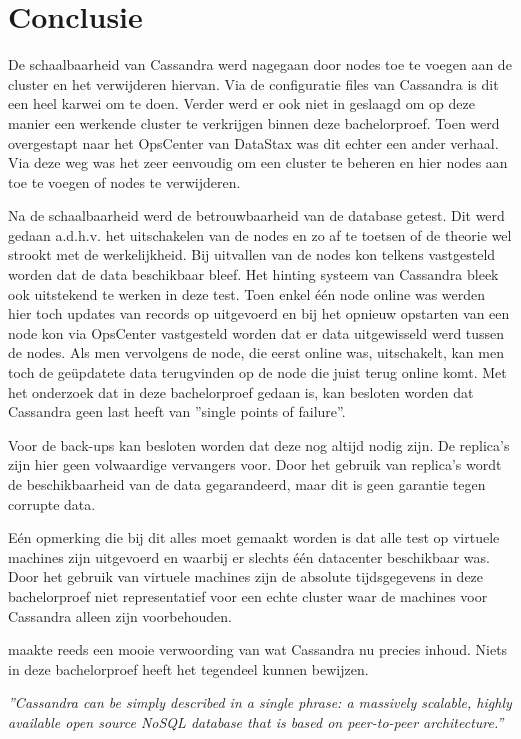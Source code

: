 \chapter{Conclusie}
\label{ch:conclusie}


De schaalbaarheid van Cassandra werd nagegaan door nodes toe te voegen aan de cluster en het verwijderen hiervan.
Via de configuratie files van Cassandra is dit een heel karwei om te doen.
Verder werd er ook niet in geslaagd om op deze manier een werkende cluster te verkrijgen binnen deze bachelorproef.
Toen werd overgestapt naar het OpsCenter van DataStax was dit echter een ander verhaal.
Via deze weg was het zeer eenvoudig om een cluster te beheren en hier nodes aan toe te voegen of nodes te verwijderen.

Na de schaalbaarheid werd de betrouwbaarheid van de database getest.
Dit werd gedaan a.d.h.v. het uitschakelen van de nodes en zo af te toetsen of de theorie wel strookt met de werkelijkheid.
Bij uitvallen van de nodes kon telkens vastgesteld worden dat de data beschikbaar bleef.
Het hinting systeem van Cassandra bleek ook uitstekend te werken in deze test.
Toen enkel één node online was werden hier toch updates van records op uitgevoerd en bij het opnieuw opstarten van een node kon via OpsCenter vastgesteld worden dat er data uitgewisseld werd tussen de nodes.
Als men vervolgens de node, die eerst online was, uitschakelt, kan men toch de geüpdatete data terugvinden op de node die juist terug online komt.
Met het onderzoek dat in deze bachelorproef gedaan is, kan besloten worden dat Cassandra geen last heeft van ''single points of failure''.

Voor de back-ups kan besloten worden dat deze nog altijd nodig zijn.
De replica's zijn hier geen volwaardige vervangers voor.
Door het gebruik van replica's wordt de beschikbaarheid van de data gegarandeerd, maar dit is geen garantie tegen corrupte data.

Eén opmerking die bij dit alles moet gemaakt worden is dat alle test op virtuele machines zijn uitgevoerd en waarbij er slechts één datacenter beschikbaar was.
Door het gebruik van virtuele machines zijn de absolute tijdsgegevens in deze bachelorproef niet representatief voor een echte cluster waar de machines voor Cassandra alleen zijn voorbehouden.

\cite{kan2014cassandra} maakte reeds een mooie verwoording van wat Cassandra nu precies inhoud.
Niets in deze bachelorproef heeft het tegendeel kunnen bewijzen.

\emph{
	''Cassandra can be simply described in a single phrase: a massively scalable, highly available open source NoSQL database that is based on peer-to-peer architecture.''
}
\citep{kan2014cassandra}
